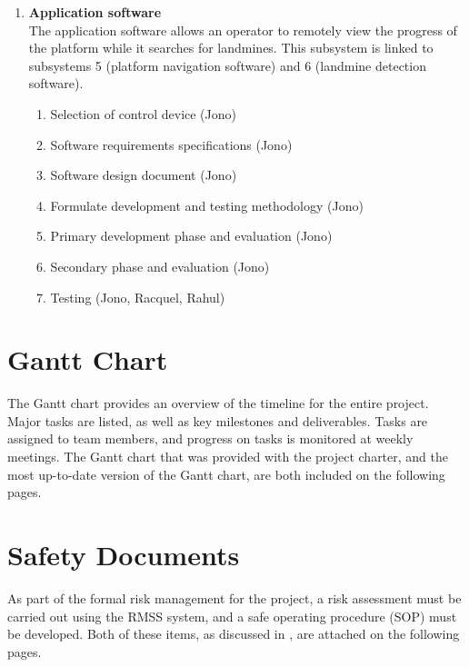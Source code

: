 \documentclass[main.tex]{subfiles}
\begin{document}
\begin{appendices}
{\begin{enumerate}
\item \textbf{Application software}\\
The application software allows an operator to remotely view the progress of the platform while it searches for landmines. This subsystem is linked to subsystems 5 (platform navigation software) and 6 (landmine detection software).
    \begin{enumerate}[label*=\arabic*.]
    \item Selection of control device (Jono)
    \item Software requirements specifications (Jono)
    \item Software design document (Jono)
    \item Formulate development and testing methodology (Jono)
    \item Primary development phase and evaluation (Jono)
    \item Secondary phase and evaluation (Jono)
    \item Testing (Jono, Racquel, Rahul)
    \end{enumerate}
\end{enumerate}}

\chapter{Gantt Chart}
The Gantt chart provides an overview of the timeline for the entire project. Major tasks are listed, as well as key milestones and deliverables. Tasks are assigned to team members, and progress on tasks is monitored at weekly meetings. The Gantt chart that was provided with the project charter, and the most up-to-date version of the Gantt chart, are both included on the following pages.



\chapter{Safety Documents}
As part of the formal risk management for the project, a risk assessment must be carried out using the RMSS system, and a safe operating  procedure (SOP) must be developed. Both of these items, as discussed in , are attached on the following pages.





\end{appendices}
\end{document}
